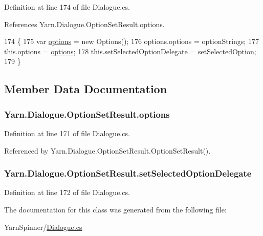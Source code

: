 Definition at line 174 of file Dialogue.\-cs.



References Yarn.\-Dialogue.\-Option\-Set\-Result.\-options.


\begin{DoxyCode}
174                                                                                                   \{
175                 var \hyperlink{a00145_abda9c3047ff9d3c3ec5540566a239315}{options} = \textcolor{keyword}{new} Options();
176                 options.options = optionStrings;
177                 this.options = \hyperlink{a00145_abda9c3047ff9d3c3ec5540566a239315}{options};
178                 this.setSelectedOptionDelegate = setSelectedOption;
179             \}
\end{DoxyCode}


\subsection{Member Data Documentation}
\hypertarget{a00145_abda9c3047ff9d3c3ec5540566a239315}{
\subsubsection[{options}]{ Yarn.\-Dialogue.\-Option\-Set\-Result.\-options}}\label{a00145_abda9c3047ff9d3c3ec5540566a239315}


Definition at line 171 of file Dialogue.\-cs.



Referenced by Yarn.\-Dialogue.\-Option\-Set\-Result.\-Option\-Set\-Result().

\hypertarget{a00145_a6f2683598cf0f62b76bb864640cc79dd}{
\subsubsection[{set\-Selected\-Option\-Delegate}]{ Yarn.\-Dialogue.\-Option\-Set\-Result.\-set\-Selected\-Option\-Delegate}}\label{a00145_a6f2683598cf0f62b76bb864640cc79dd}


Definition at line 172 of file Dialogue.\-cs.



The documentation for this class was generated from the following file\-:\begin{DoxyCompactItemize}
\item 
Yarn\-Spinner/\hyperlink{a00305}{Dialogue.\-cs}\end{DoxyCompactItemize}
